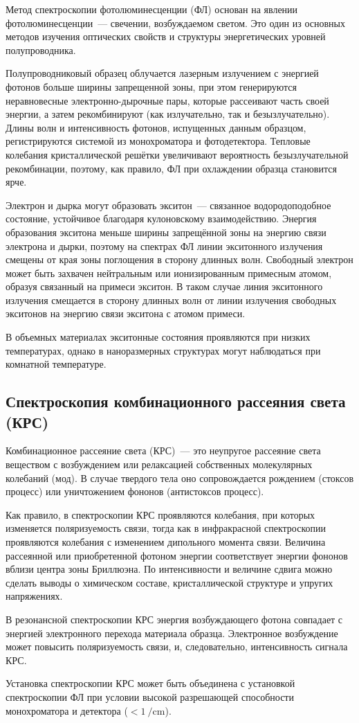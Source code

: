 Метод спектроскопии фотолюминесценции (ФЛ) основан на явлении
фотолюминесценции~--- свечении, возбуждаемом светом. Это один из основных
методов изучения оптических свойств и структуры энергетических уровней
полупроводника.

Полупроводниковый образец облучается лазерным излучением с энергией фотонов
больше ширины запрещенной зоны, при этом генерируются неравновесные
электронно-дырочные пары, которые рассеивают часть своей энергии, а затем
рекомбинируют (как излучательно, так и безызлучательно). Длины волн и
интенсивность фотонов, испущенных данным образцом, регистрируются системой из
монохроматора и фотодетектора. Тепловые колебания кристаллической решётки
увеличивают вероятность безызлучательной рекомбинации, поэтому, как правило, ФЛ
при охлаждении образца становится ярче.

Электрон и дырка могут образовать экситон~--- связанное водородоподобное
состояние, устойчивое благодаря кулоновскому взаимодействию. Энергия
образования экситона меньше ширины запрещённой зоны на энергию связи электрона
и дырки, поэтому на спектрах ФЛ линии экситонного излучения смещены от края
зоны поглощения в сторону длинных волн. Свободный электрон может быть захвачен
нейтральным или ионизированным примесным атомом, образуя связанный на примеси
экситон. В таком случае линия экситонного излучения смещается в сторону длинных
волн от линии излучения свободных экситонов на энергию связи экситона с атомом
примеси.

В объемных материалах экситонные состояния проявляются при низких температурах,
однако в наноразмерных структурах могут наблюдаться при комнатной температуре.

\subsection{Спектроскопия комбинационного рассеяния света
(КРС)}\label{subsec:ch2/sec2/sub4}

Комбинационное рассеяние света (КРС)~--- это неупругое рассеяние света
веществом с возбуждением или релаксацией собственных молекулярных колебаний
(мод). В случае твердого тела оно сопровождается рождением (стоксов процесс)
или уничтожением фононов (антистоксов процесс).

Как правило, в спектроскопии КРС проявляются колебания, при которых изменяется
поляризуемость связи, тогда как в инфракрасной спектроскопии проявляются
колебания с изменением дипольного момента связи. Величина рассеянной или
приобретенной фотоном энергии соответствует энергии фононов вблизи центра зоны
Бриллюэна. По интенсивности и величине сдвига можно сделать выводы о химическом
составе, кристаллической структуре и упругих напряжениях.

В резонансной спектроскопии КРС энергия возбуждающего фотона совпадает с
энергией электронного перехода материала образца. Электронное возбуждение может
повысить поляризуемость связи, и, следовательно, интенсивность сигнала КРС.

Установка спектроскопии КРС может быть объединена с установкой спектроскопии ФЛ
при условии высокой разрешающей способности монохроматора и детектора (\(<
1~\si{\per\centi\meter}\)).

\FloatBarrier
